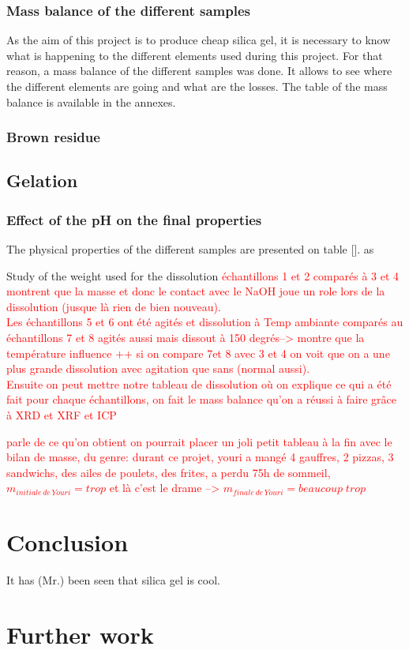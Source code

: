 \documentclass[12pt,a4paper]{article}
\begin{document}
\subsubsection{Mass balance of the different samples}
As the aim of this project is to produce cheap silica gel, it is necessary to know what is happening to the different elements used during this project. For that reason, a mass balance of the different samples was done. It allows to see where the different elements are going and what are the losses. The table of the mass balance is available in the annexes.
\subsubsection{Brown residue}

\subsection{Gelation}
\subsubsection{Effect of the pH on the final properties}
The physical properties of the different samples are presented on table []. as






Study of the weight used for the dissolution 
\textcolor{red}{échantillons 1 et 2 comparés à 3 et 4 montrent que la masse et donc le contact avec le NaOH joue un role lors de la dissolution (jusque là rien de bien nouveau).
\\Les échantillons 5 et 6 ont été agités et dissolution à Temp ambiante comparés au échantillons 7 et 8 agités aussi mais dissout à 150 degrés--> montre que la température influence ++ si on compare 7et 8 avec 3 et 4 on voit que on a une plus grande dissolution avec agitation que sans (normal aussi).
\\Ensuite on peut mettre notre tableau de dissolution où on explique ce qui a été fait pour chaque échantillons, on fait le mass balance qu'on a réussi à faire grâce à XRD et XRF et ICP}

\textcolor{red}{ parle de ce qu'on obtient
on pourrait placer un joli petit tableau à la fin avec le bilan de masse, du genre: durant ce projet, youri a mangé 4 gauffres, 2 pizzas, 3 sandwichs, des ailes de poulets, des frites, a perdu 75h de sommeil, 
\\$m_{initiale\, de \, Youri}=trop$ et là c'est le drame --> $m_{finale\, de \, Youri}=beaucoup\; trop$}



\section{Conclusion}
It has (Mr.) been seen that silica gel is cool.

\section{Further work}
\clearpage


\end{document}
